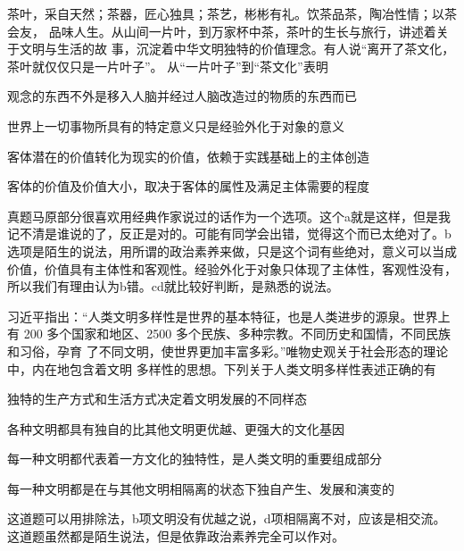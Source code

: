 \documentclass[lang=cn,newtx,10pt,scheme=chinese,pad,twocol]{zznote}
\begin{document}
\begin{exercise}茶叶，采自天然；茶器，匠心独具；茶艺，彬彬有礼。饮茶品茶，陶冶性情；以茶会友， 品味人生。从山间一片叶，到万家杯中茶，茶叶的生长与旅行，讲述着关于文明与生活的故 事，沉淀着中华文明独特的价值理念。有人说“离开了茶文化，茶叶就仅仅只是一片叶子”。 从“一片叶子”到“茶文化”表明
	\begin{choice}
		\item 观念的东西不外是移入人脑并经过人脑改造过的物质的东西而已
		\item 世界上一切事物所具有的特定意义只是经验外化于对象的意义
		\item 客体潜在的价值转化为现实的价值，依赖于实践基础上的主体创造
		\item 客体的价值及价值大小，取决于客体的属性及满足主体需要的程度
	\end{choice}
\end{exercise}
\begin{solution}
	真题马原部分很喜欢用经典作家说过的话作为一个选项。这个a就是这样，但是我记不清是谁说的了，反正是对的。可能有同学会出错，觉得这个而已太绝对了。b选项是陌生的说法，用所谓的政治素养来做，只是这个词有些绝对，意义可以当成价值，价值具有主体性和客观性。经验外化于对象只体现了主体性，客观性没有，所以我们有理由认为b错。cd就比较好判断，是熟悉的说法。
\end{solution}

\begin{exercise}习近平指出：“人类文明多样性是世界的基本特征，也是人类进步的源泉。世界上有 200 多个国家和地区、2500 多个民族、多种宗教。不同历史和国情，不同民族和习俗，孕育 了不同文明，使世界更加丰富多彩。”唯物史观关于社会形态的理论中，内在地包含着文明 多样性的思想。下列关于人类文明多样性表述正确的有
	\begin{choice}
		\item 独特的生产方式和生活方式决定着文明发展的不同样态
		\item 各种文明都具有独自的比其他文明更优越、更强大的文化基因
		\item 每一种文明都代表着一方文化的独特性，是人类文明的重要组成部分
		\item 每一种文明都是在与其他文明相隔离的状态下独自产生、发展和演变的
	\end{choice}
\end{exercise}
\begin{solution}
	这道题可以用排除法，b项文明没有优越之说，d项相隔离不对，应该是相交流。这道题虽然都是陌生说法，但是依靠政治素养完全可以作对。
\end{solution}
\end{document}
